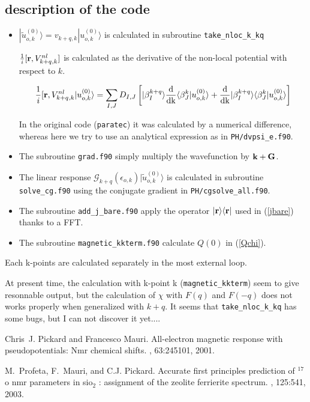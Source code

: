 \documentclass[11pt, a4paper]{article}
\begin{document}
\subsection{description of the code}

\begin{itemize}
\item $|\tilde{u}_{o,k}^{(0)}\rangle=v_{k+q,k}|u_{o,k}^{(0)}\rangle$
  is calculated in subroutine \verb+take_nloc_k_kq+

$\frac{1}{i}[{\bf r},V^{nl}_{k+q,k}]$ is calculated as the derivative
    of the non-local potential with respect to $k$.

\begin{equation}
\frac{1}{i}[{\bf r},V^{nl}_{k+q,k}|u_{o,k}^{(0)}\rangle = \sum_{I,J}
  D_{I,J} \left [ |\beta_I^{k+q}\rangle \frac{\rm d}{\rm dk} \langle
    \beta_J^{k}|u_{o,k}^{(0)}\rangle +  \frac{\rm d}{\rm
      dk}|\beta_I^{k+q} \rangle
  \langle\beta_J^{k}|u_{o,k}^{(0)}\rangle \right]
\end{equation}

In the original code (\verb+paratec+) it was calculated by a numerical
difference, whereas here we try to use an analytical expression as in
\verb+PH/dvpsi_e.f90+. 

\item The subroutine \verb+grad.f90+ simply multiply the wavefunction by
  ${\bf k + G}$.

\item The linear response
  $\mathcal{G}_{k+q}(\epsilon_{o,k})|\tilde{u}_{o,k}^{(0)}\rangle$ is
  calculated in subroutine \verb+solve_cg.f90+ using the conjugate
  gradient in \verb+PH/cgsolve_all.f90+.

\item The subroutine \verb+add_j_bare.f90+ apply the operator $|{\bf
  r}\rangle \langle {\bf r}|$ used in (\ref{jbare}) thanks to a FFT.

\item The subroutine \verb+magnetic_kkterm.f90+ calculate $Q(0)$ in
  (\ref{Qchi}). 

\end{itemize}

Each k-points are calculated separately in the most external loop.

At present time, the calculation with k-point k (\verb+magnetic_kkterm+)
seem to give resonnable output, but the calculation of $\chi$ with
$F(q)$ and $F(-q)$ does not works properly when generalized with
$k+q$. It seems that \verb+take_nloc_k_kq+ has some bugs, but I can
not discover it yet....    

\begin{thebibliography}{1}

Chris~J. Pickard and Francesco Mauri.
\newblock All-electron magnetic response with pseudopotentials: Nmr chemical
  shifts.
, 63:245101, 2001.

M.~Profeta, F.~Mauri, and C.J. Pickard.
\newblock Accurate first principles prediction of $^{17}$o nmr parameters in
  sio$_2$ : assignment of the zeolite ferrierite spectrum.
, 125:541, 2003.

\end{thebibliography}
\end{document}

